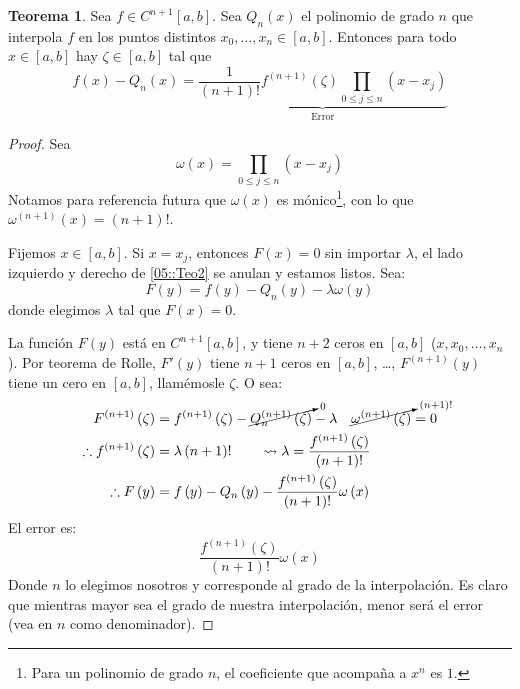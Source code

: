 \documentclass[english, spanish, fleqn, 10pt]{article}
\numberwithin{equation}{section}
\newcommand{\nparentesis}[1]{\left( #1 \right)}
\newcommand{\ncorchetes}[1]{\left[ #1 \right]}
\theoremstyle{definition}
\newtheorem{teorema}{Teorema}[section]
\begin{document}
\begin{teorema}
	Sea $f\in C^{n+1}\ncorchetes{a, b}$. Sea $Q_n\nparentesis{x}$ el polinomio de grado $n$ que interpola $f$ en los puntos distintos $x_0, \ldots, x_n\in\ncorchetes{a, b}$. Entonces para todo $x\in\ncorchetes{a, b}$ hay $\zeta\in\ncorchetes{a, b}$ tal que
	\begin{equation}\label{05::Teo2}
	f\nparentesis{x}-Q_n\nparentesis{x}=\underbrace{\dfrac{1}{\nparentesis{n+1}!}f^{\nparentesis{n+1}}\nparentesis{\zeta}\prod_{0\leq j\leq n}\nparentesis{x-x_j}}_{\text{Error}}
	\end{equation}
\end{teorema}
\begin{proof}
	Sea
	\begin{equation}
	\omega\nparentesis{x}=\prod_{0\leq j\leq n}\nparentesis{x-x_j}
	\end{equation}
	Notamos para referencia futura que $\omega\nparentesis{x}$ es mónico\footnote{Para un polinomio de grado $n$, el coeficiente que acompaña a $x^n$ es $1$.}, con lo que $\omega^{\nparentesis{n+1}}\nparentesis{x}=\nparentesis{n+1}!$.
	
	Fijemos $x\in\ncorchetes{a, b}$. Si $x=x_j$, entonces $F\nparentesis{x}=0$ sin importar $\lambda$, el lado izquierdo y derecho de \eqref{05::Teo2} se anulan y estamos listos. Sea:
	\begin{equation}
	F\nparentesis{y}=f\nparentesis{y}-Q_n\nparentesis{y}-\lambda\omega\nparentesis{y}
	\end{equation}
	donde elegimos $\lambda$ tal que $F\nparentesis{x}=0$.
	
	La función $F\nparentesis{y}$ está en $C^{n+1}\ncorchetes{a, b}$, y tiene $n+2$ ceros en $\ncorchetes{a, b}$ ($x, x_0, \ldots, x_n$). Por teorema de Rolle, $F'\nparentesis{y}$ tiene $n+1$ ceros en $\ncorchetes{a, b}$, \ldots, $F^{\nparentesis{n+1}}\nparentesis{y}$ tiene un cero en $\ncorchetes{a, b}$, llamémosle $\zeta$. O sea:
	\begin{align*}
	F^{\nparentesis{n+1}}\nparentesis{\zeta}&=f^{\nparentesis{n+1}}\nparentesis{\zeta}-\cancelto{\scriptstyle 0}{Q_n^{\nparentesis{n+1}}\nparentesis{\zeta}}-\lambda\quad\cancelto{\scriptstyle\nparentesis{n+1}!}{\omega^{\nparentesis{n+1}}\nparentesis{\zeta}}=0\\
	\therefore f^{\nparentesis{n+1}}\nparentesis{\zeta}&=\lambda\nparentesis{n+1}!\qquad \rightsquigarrow \lambda =\dfrac{f^{\nparentesis{n+1}}\nparentesis{\zeta}}{\nparentesis{n+1}!}\\
	\therefore F\nparentesis{y}&=f\nparentesis{y}-Q_n\nparentesis{y}-\dfrac{f^{\nparentesis{n+1}}\nparentesis{\zeta}}{\nparentesis{n+1}!}\omega\nparentesis{x}
	\end{align*}
	El error es:
	\begin{equation*}
	\dfrac{f^{\nparentesis{n+1}}\nparentesis{\zeta}}{\nparentesis{n+1}!}\omega\nparentesis{x}
	\end{equation*}
	Donde $n$ lo elegimos nosotros y corresponde al grado de la interpolación. Es claro que mientras mayor sea el grado de nuestra interpolación, menor será el error (vea en $n$ como denominador).
\end{proof}
\end{document}
